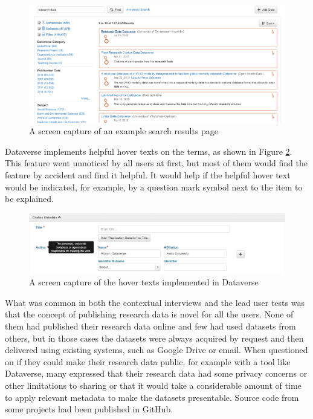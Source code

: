 \begin{figure}
    \begin{centering}
        \includegraphics[width=\textwidth]{images/search_results}
    \end{centering}
    \caption{A screen capture of an example search results page}
    \label{fig:search_results}
\end{figure}

Dataverse implements helpful hover texts on the terms, as shown in Figure
\ref{fig:hovertext}. This feature went unnoticed by all users at first, but
most of them would find the feature by accident and find it helpful. It would
help if the helpful hover text would be indicated, for example, by a question
mark symbol next to the item to be explained.

\begin{figure}
    \begin{centering}
        \includegraphics[width=\textwidth]{images/hovertext}
    \end{centering}
    \caption{A screen capture of the hover texts implemented in Dataverse}
    \label{fig:hovertext}
\end{figure}

What was common in both the contextual interviews and the lead user tests was
that the concept of publishing research data is novel for all the users. None
of them had published their research data online and few had used datasets from others,
but in those cases the datasets were always acquired by request and then
delivered using existing systems, such as Google Drive or email. When 
questioned on if they could make their research data public, for example with a tool
like Dataverse, many expressed that their research data had some privacy
concerns or other limitations to sharing or that it would take a considerable
amount of time to apply relevant metadata to make the datasets presentable.
Source code from some projects had been published in GitHub.

